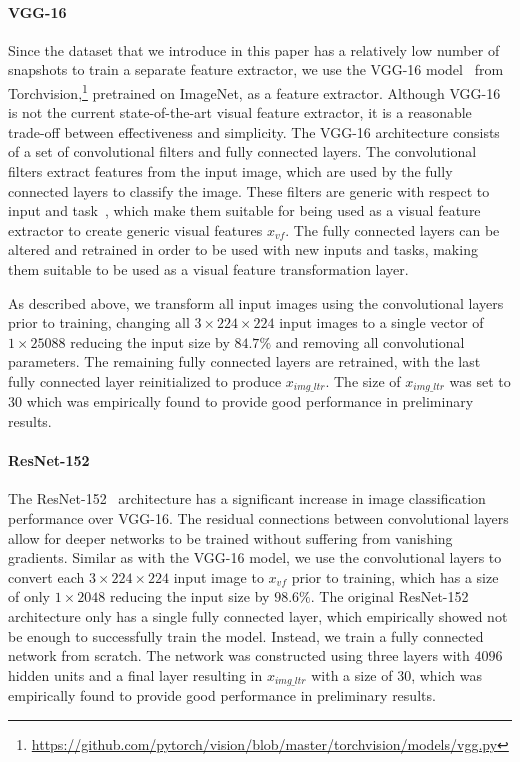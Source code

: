 \paragraph{VGG-16}
Since the \datasetname{} data\-set that we introduce in this paper has a relatively low number of snapshots to train a separate feature extractor, we use the VGG-16 model~\cite{simonyan2014very} from Torchvision,\footnote{\url{https://github.com/pytorch/vision/blob/master/torchvision/models/vgg.py}} pretrained on ImageNet, as a feature extractor. 
Although VGG-16 is not the current state-of-the-art visual feature extractor, it is a reasonable trade-off between effectiveness and simplicity.
The VGG-16 architecture consists of a set of convolutional filters and fully connected layers. 
The convolutional filters extract features from the input image, which are used by the fully connected layers to classify the image. 
These filters are generic with respect to input and task~\citep{donahue2014decaf}, which make them suitable for being used as a visual feature extractor to create generic visual features $x_{vf}$. The fully connected layers can be altered and retrained in order to be used with new inputs and tasks, making them suitable to be used as a visual feature transformation layer.

As described above, we transform all input images using the convolutional layers prior to training, changing all $3\times224\times224$ input images to a single vector of $1\times25088$ reducing the input size by $84.7\%$ and removing all convolutional parameters. The remaining fully connected layers are retrained, with the last fully connected layer reinitialized to produce $x_{img\_ltr}$. The size of $x_{img\_ltr}$ was set to $30$ which was empirically found to provide good performance in preliminary results.


\paragraph{ResNet-152}
The ResNet-152~\cite{he2016deep} architecture has a significant increase in image classification performance over VGG-16. The residual connections between convolutional layers allow for deeper networks to be trained without suffering from vanishing gradients. Similar as with the VGG-16 model, we use the convolutional layers to convert each $3\times224\times224$ input image to $x_{vf}$ prior to training, which has a size of only $1\times2048$ reducing the input size by $98.6\%$. The original ResNet-152 architecture only has a single fully connected layer, which empirically showed not be enough to successfully train the model. Instead, we train a fully connected network from scratch. The network was constructed using three layers with $4096$ hidden units and a final layer resulting in $x_{img\_ltr}$ with a size of $30$, which was empirically found to provide good performance in preliminary results.


